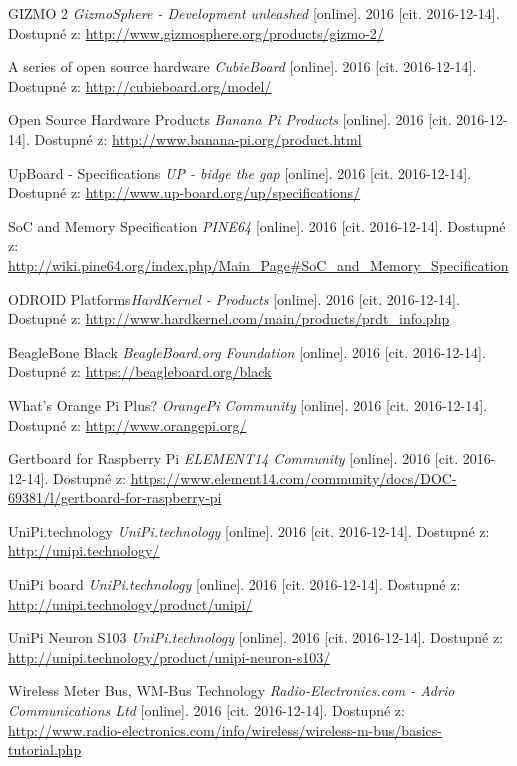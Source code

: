 \begin{literatura}{99}
 GIZMO 2 \textit{GizmoSphere - Development unleashed} [online]. 2016 [cit. 2016-12-14]. Dostupné z: \url{http://www.gizmosphere.org/products/gizmo-2/}

 A series of open source hardware \textit{CubieBoard} [online]. 2016 [cit. 2016-12-14]. Dostupné z: \url{http://cubieboard.org/model/}
				
 Open Source Hardware Products \textit{Banana Pi Products} [online]. 2016 [cit. 2016-12-14]. Dostupné z: \url{http://www.banana-pi.org/product.html}

 UpBoard - Specifications \textit{UP - bidge the gap} [online]. 2016 [cit. 2016-12-14]. Dostupné z: \url{http://www.up-board.org/up/specifications/}

 SoC and Memory Specification \textit{PINE64} [online]. 2016 [cit. 2016-12-14]. Dostupné z: \url{http://wiki.pine64.org/index.php/Main\_Page\#SoC\_and\_Memory\_Specification}

 ODROID Platforms\textit{HardKernel - Products} [online]. 2016 [cit. 2016-12-14]. Dostupné z: \url{http://www.hardkernel.com/main/products/prdt\_info.php}

 BeagleBone Black \textit{BeagleBoard.org Foundation} [online]. 2016 [cit. 2016-12-14]. Dostupné z: \url{https://beagleboard.org/black}

 What’s Orange Pi Plus? \textit{OrangePi Community} [online]. 2016 [cit. 2016-12-14]. Dostupné z: \url{http://www.orangepi.org/}

 Gertboard for Raspberry Pi \textit{ELEMENT14 Community} [online]. 2016 [cit. 2016-12-14]. Dostupné z: \url{https://www.element14.com/community/docs/DOC-69381/l/gertboard-for-raspberry-pi}

 UniPi.technology \textit{UniPi.technology} [online]. 2016 [cit. 2016-12-14]. Dostupné z: \url{http://unipi.technology/}
				
 UniPi board \textit{UniPi.technology} [online]. 2016 [cit. 2016-12-14]. Dostupné z: \url{http://unipi.technology/product/unipi/}
				
 UniPi Neuron S103 \textit{UniPi.technology} [online]. 2016 [cit. 2016-12-14]. Dostupné z: \url{http://unipi.technology/product/unipi-neuron-s103/}

 Wireless Meter Bus, WM-Bus Technology \textit{Radio-Electronics.com - Adrio Communications Ltd} [online]. 2016 [cit. 2016-12-14]. Dostupné z: \url{http://www.radio-electronics.com/info/wireless/wireless-m-bus/basics-tutorial.php}
				

\end{literatura}
